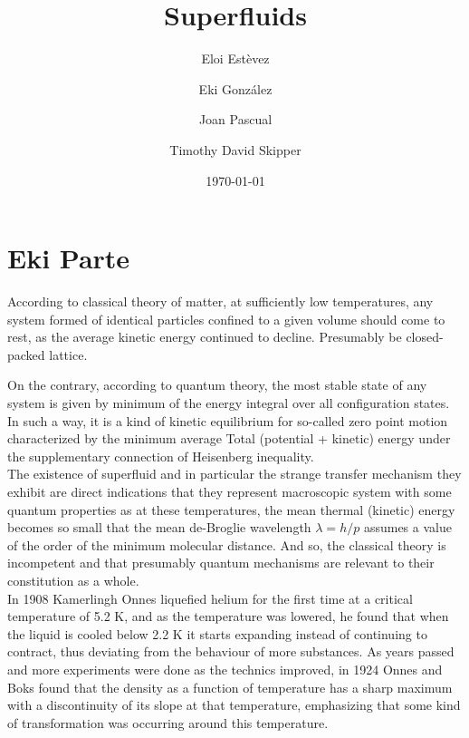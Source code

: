 \documentclass{article}
\title{Superfluids}
\author{Eloi Estèvez \and Eki González \and Joan Pascual \and Timothy David Skipper}
\date{\today}
\begin{document}
\maketitle
\begin{abstract}
\end{abstract}

\tableofcontents
\newpage

\section{Eki Parte}

According to classical theory of matter, at sufficiently low temperatures, any system formed of identical particles confined to a given volume should come to rest, as the average kinetic energy continued to decline. Presumably be closed-packed lattice.


On the contrary, according to quantum theory, the most stable state of any system is given by minimum of the energy integral over all configuration states. In such a way, it is a kind of kinetic equilibrium for so-called zero point motion characterized by the minimum average Total (potential + kinetic) energy under the supplementary connection of Heisenberg inequality.
\\

The existence of superfluid and in particular the strange transfer mechanism they exhibit are direct indications that they represent macroscopic system with some quantum properties as at these temperatures, the mean thermal (kinetic) energy becomes so small that the mean de-Broglie wavelength $\lambda = h/p$ assumes a value of the order of the minimum molecular distance. And so, the classical theory is incompetent and that presumably quantum mechanisms are relevant to their constitution as a whole.
\\

In 1908 Kamerlingh Onnes liquefied helium for the first time at a critical temperature of 5.2 K, and as the temperature was lowered, he found that when the liquid is cooled below 2.2 K it starts expanding instead of continuing to contract, thus deviating from the behaviour of more substances.
As years passed and more experiments were done as the technics improved, in 1924 Onnes and Boks found that the density as a function of temperature has a sharp maximum with a discontinuity of its slope at that temperature, emphasizing that some kind of transformation was occurring around this temperature.
\\
\end{document}
